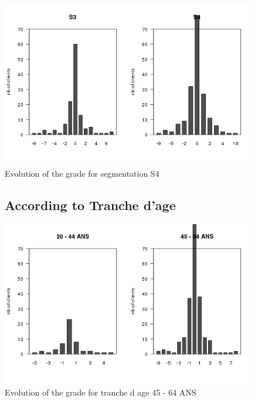 \documentclass[a4paper, 11pt]{article}
\begin{document}
        \begin{figure}[!ht]
                \centering
                \includegraphics[height = 10 cm]{Remi/Evolution_of_the_grade_for_segmentation_S4.png}
                \caption{Evolution of the grade for segmentation S4}
                \label{fig:e_seg_S4}
        \end{figure}

        \begin{figure}[!ht]
				\subsection{According to Tranche d'age}
                \centering
                \includegraphics[height = 10 cm]{Remi/Evolution_of_the_grade_for_tranche_d_age_45-64-ANS.png}
                \caption{Evolution of the grade for tranche d age 45 - 64 ANS}
                \label{fig:e_age_45 - 64 ANS}
        \end{figure}
\end{document}
